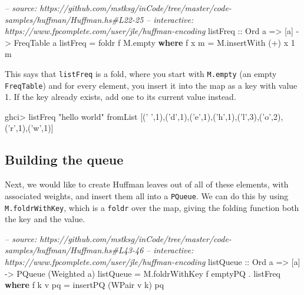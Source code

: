 \documentclass[]{article}
\newenvironment{Shaded}{\begin{snugshade}}{\end{snugshade}}
\newcommand{\CharTok}[1]{\textcolor[rgb]{0.31,0.60,0.02}{#1}}
\newcommand{\CommentTok}[1]{\textcolor[rgb]{0.56,0.35,0.01}{\textit{#1}}}
\newcommand{\DataTypeTok}[1]{\textcolor[rgb]{0.13,0.29,0.53}{#1}}
\newcommand{\DecValTok}[1]{\textcolor[rgb]{0.00,0.00,0.81}{#1}}
\newcommand{\FunctionTok}[1]{\textcolor[rgb]{0.00,0.00,0.00}{#1}}
\newcommand{\KeywordTok}[1]{\textcolor[rgb]{0.13,0.29,0.53}{\textbf{#1}}}
\newcommand{\NormalTok}[1]{#1}
\newcommand{\OtherTok}[1]{\textcolor[rgb]{0.56,0.35,0.01}{#1}}
\newcommand{\StringTok}[1]{\textcolor[rgb]{0.31,0.60,0.02}{#1}}
\begin{document}
\begin{Shaded}
\begin{Highlighting}[]
\CommentTok{-- source: https://github.com/mstksg/inCode/tree/master/code-samples/huffman/Huffman.hs#L22-25}
\CommentTok{-- interactive: https://www.fpcomplete.com/user/jle/huffman-encoding}
\OtherTok{listFreq ::} \DataTypeTok{Ord}\NormalTok{ a }\OtherTok{=>}\NormalTok{ [a] }\OtherTok{->} \DataTypeTok{FreqTable}\NormalTok{ a}
\NormalTok{listFreq }\FunctionTok{=}\NormalTok{ foldr f M.empty}
  \KeywordTok{where}
\NormalTok{    f x m }\FunctionTok{=}\NormalTok{ M.insertWith (}\FunctionTok{+}\NormalTok{) x }\DecValTok{1}\NormalTok{ m}
\end{Highlighting}
\end{Shaded}

This says that \texttt{listFreq} is a fold, where you start with
\texttt{M.empty} (an empty \texttt{FreqTable}) and for every element, you insert
it into the map as a key with value 1. If the key already exists, add one to its
current value instead.

\begin{Shaded}
\begin{Highlighting}[]
\NormalTok{ghci}\FunctionTok{>}\NormalTok{ listFreq }\StringTok{"hello world"}
\NormalTok{fromList [(}\CharTok{' '}\NormalTok{,}\DecValTok{1}\NormalTok{),(}\CharTok{'d'}\NormalTok{,}\DecValTok{1}\NormalTok{),(}\CharTok{'e'}\NormalTok{,}\DecValTok{1}\NormalTok{),(}\CharTok{'h'}\NormalTok{,}\DecValTok{1}\NormalTok{),(}\CharTok{'l'}\NormalTok{,}\DecValTok{3}\NormalTok{),(}\CharTok{'o'}\NormalTok{,}\DecValTok{2}\NormalTok{),(}\CharTok{'r'}\NormalTok{,}\DecValTok{1}\NormalTok{),(}\CharTok{'w'}\NormalTok{,}\DecValTok{1}\NormalTok{)]}
\end{Highlighting}
\end{Shaded}

\hypertarget{building-the-queue}{%
\subsection{Building the queue}\label{building-the-queue}}

Next, we would like to create Huffman leaves out of all of these elements, with
associated weights, and insert them all into a \texttt{PQueue}. We can do this
by using \texttt{M.foldrWithKey}, which is a \texttt{foldr} over the map, giving
the folding function both the key and the value.

\begin{Shaded}
\begin{Highlighting}[]
\CommentTok{-- source: https://github.com/mstksg/inCode/tree/master/code-samples/huffman/Huffman.hs#L43-46}
\CommentTok{-- interactive: https://www.fpcomplete.com/user/jle/huffman-encoding}
\OtherTok{listQueue ::} \DataTypeTok{Ord}\NormalTok{ a }\OtherTok{=>}\NormalTok{ [a] }\OtherTok{->} \DataTypeTok{PQueue}\NormalTok{ (}\DataTypeTok{Weighted}\NormalTok{ a)}
\NormalTok{listQueue }\FunctionTok{=}\NormalTok{ M.foldrWithKey f emptyPQ }\FunctionTok{.}\NormalTok{ listFreq}
  \KeywordTok{where}
\NormalTok{    f k v pq }\FunctionTok{=}\NormalTok{ insertPQ (}\DataTypeTok{WPair}\NormalTok{ v k) pq}
\end{Highlighting}
\end{Shaded}
\end{document}
